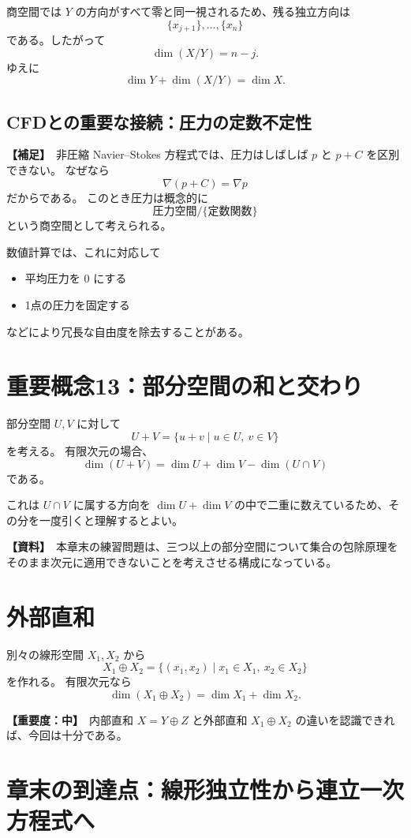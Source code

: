 \documentclass[a4paper,11pt]{ltjsarticle}
\newcommand{\sourceitem}{\textbf{【資料】}}
\newcommand{\suppitem}{\textbf{【補足】}}
\newcommand{\midimportance}{\textbf{【重要度：中】}}
\begin{document}
商空間では $Y$ の方向がすべて零と同一視されるため、残る独立方向は
\[
\{x_{j+1}\},\dots,\{x_n\}
\]
である。したがって
\[
\dim(X/Y)=n-j.
\]
ゆえに
\[
\boxed{\dim Y+\dim(X/Y)=\dim X}.
\]

\subsection{CFDとの重要な接続：圧力の定数不定性}
\suppitem\ 非圧縮 Navier--Stokes 方程式では、圧力はしばしば $p$ と $p+C$ を区別できない。
なぜなら
\[
\nabla(p+C)=\nabla p
\]
だからである。
このとき圧力は概念的に
\[
\text{圧力空間}/\{\text{定数関数}\}
\]
という商空間として考えられる。

数値計算では、これに対応して
\begin{itemize}
  \item 平均圧力を $0$ にする
  \item 1点の圧力を固定する
\end{itemize}
などにより冗長な自由度を除去することがある。

\section{重要概念13：部分空間の和と交わり}

部分空間 $U,V$ に対して
\[
U+V=\{u+v\mid u\in U,\ v\in V\}
\]
を考える。
有限次元の場合、
\[
\boxed{
\dim(U+V)
=
\dim U+
\dim V-
\dim(U\cap V)
}
\]
である。

これは $U\cap V$ に属する方向を $\dim U+\dim V$ の中で二重に数えているため、その分を一度引くと理解するとよい。

\sourceitem\ 本章末の練習問題は、三つ以上の部分空間について集合の包除原理をそのまま次元に適用できないことを考えさせる構成になっている。

\section{外部直和}

別々の線形空間 $X_1,X_2$ から
\[
X_1\oplus X_2
=
\{(x_1,x_2)\mid x_1\in X_1,\ x_2\in X_2\}
\]
を作れる。
有限次元なら
\[
\dim(X_1\oplus X_2)=\dim X_1+\dim X_2.
\]

\midimportance\ 内部直和 $X=Y\oplus Z$ と外部直和 $X_1\oplus X_2$ の違いを認識できれば、今回は十分である。

\section{章末の到達点：線形独立性から連立一次方程式へ}
\end{document}
